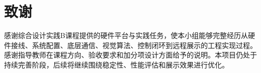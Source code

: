 \chapter{致谢}

感谢综合设计实践B课程提供的硬件平台与实践任务，使本小组能够完整经历从硬件接线、系统配置、底层通信、视觉算法、控制闭环到远程展示的工程实现过程。感谢指导教师在课程方向、验收要求和加分项设计方面给予的说明。本项目仍处于持续完善阶段，后续将继续围绕稳定性、性能评估和展示效果进行优化。
